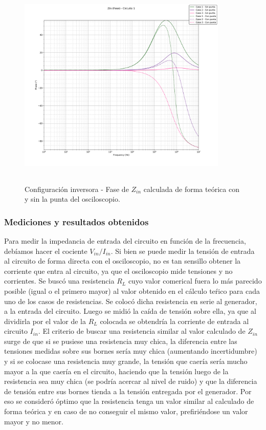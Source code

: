 \begin{figure}[H] %
	\centering
	\includegraphics[width=10cm,height=10cm,keepaspectratio]{../EJ1/00GRAFICOS/teoricos/circ1zinfases.png}
	\caption{Configuración inversora - Fase de $Z_{in}$ calculada de forma te\'orica con y sin la punta del osciloscopio.}
	\label{c1zintp}
\end{figure}




\subsubsection*{Mediciones y resultados obtenidos} %
Para medir la impedancia de entrada del circuito en funci\'on de la frecuencia, deb\'iamos hacer el cociente $V_{in}/I_{in}$. Si bien se puede medir la tensi\'on de entrada al circuito de forma directa con el osciloscopio, no es tan sensillo obtener la corriente que entra al circuito, ya que el osciloscopio mide tensiones y no corrientes. Se busc\'o una resistencia $R_L$ cuyo valor comerical fuera lo m\'as parecido posible (igual o el primero mayor) al valor obtenido en el c\'alculo te\'rico para cada uno de los casos de resistencias. Se coloc\'o dicha resistencia en serie al generador, a la entrada del circuito. Luego se midi\'o la ca\'ida de tensi\'on sobre ella, ya que al dividirla por el valor de la $R_L$ colocada se obtendr\'ia la corriente de entrada al circuito $I_{in}$. El criterio de buscar una resistencia similar al valor calculado de $Z_{in}$ surge de que si se pusiese una resistencia muy chica, la diferencia entre las tensiones medidas sobre sus bornes ser\'ia muy chica (aumentando incertidumbre) y si se colocase una resistencia muy grande, la tensi\'on que caer\'ia ser\'ia mucho mayor a la que caer\'ia en el circuito, haciendo que la tensi\'on luego de la resistencia sea muy chica (se podr\'ia acercar al nivel de ruido) y que la diferencia de tensi\'on entre sus bornes tienda a la tensi\'on entregada por el generador. Por eso se consider\'o \'optimo que la resistencia tenga un valor similar al calculado de forma te\'orica y en caso de no conseguir el mismo valor, prefiri\'endose un valor mayor y no menor.

